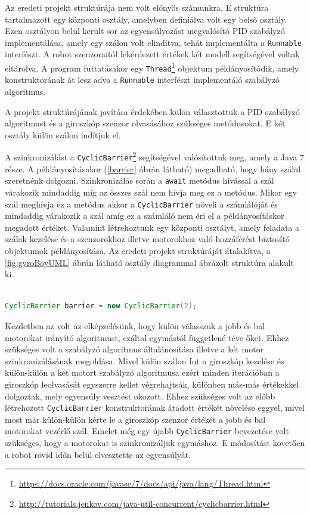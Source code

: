 Az eredeti projekt struktúrája nem volt előnyös számunkra. E struktúra tartalmazott egy központi osztály, amelyben definiálva volt egy belső osztály. Ezen osztályon belül került sor az egyensúlyozást megvalósító PID szabályzó implementálása, amely egy szálon volt elindítva, tehát implementálta a \texttt{Runnable} interfészt. A robot szenzoraitól lekérdezett értékek két modell segítségével voltak eltárolva. A program futtatásakor egy \texttt{Thread}\footnote{\href{https://docs.oracle.com/javase/7/docs/api/java/lang/Thread.html}{https://docs.oracle.com/javase/7/docs/api/java/lang/Thread.html}} objektum példányosítódik, amely konstruktorának át lesz adva a \texttt{Runnable} interfészt implementáló szabályzó algoritmus.

A projekt struktúrájának javítása érdekében külön választottuk a PID szabályzó algoritmust és a giroszkóp szenzor olvasásához szükséges metódusokat. E két osztály külön szálon indítjuk el. 

A szinkronizálást a \texttt{CyclicBarrier}\footnote{\href{http://tutorials.jenkov.com/java-util-concurrent/cyclicbarrier.html}{http://tutorials.jenkov.com/java-util-concurrent/cyclicbarrier.html}} segítségével valósítottuk meg, amely a Java 7 része. A példányosításakor (\ref{barrier} ábrán látható) megadható, hogy hány szálal szeretnénk dolgozni. Szinkronizálás során a \texttt{await} metódus hívással a szál várakozik mindaddig míg az összes szál nem hívja meg ez a metódus. Mikor egy szál meghívja ez a metódus akkor a \texttt{CyclicBarrier} növeli a számlálóját és mindaddig várakozik a szál amíg ez a számláló nem éri el a példányosításkor megadott értéket. Valamint létrehoztunk egy központi osztályt, amely feladata a szálak kezelése és a szenzorokhoz illetve motorokhoz való hozzáférést biztosító objektumok példányosítása. Az eredeti projekt struktúráját átalakítva, a \ref{fig:gyroBoyUML} ábrán látható osztály diagrammal ábrázolt struktúra alakult ki.

\begin{lstlisting}[label=barrier, caption= CyclicBarrier példányosítása , language=Java]

CyclicBarrier barrier = new CyclicBarrier(2);

\end{lstlisting}

Kezdetben az volt az elképzelésünk, hogy külön válasszuk a jobb és bal motorokat irányító algoritmust, ezáltal egymástól függetlené téve őket. Ehhez szükséges volt a szabályzó algoritmus általánosítása illetve a két motor szinkronizálásának megoldása. Mivel külön szálon fut a giroszkóp kezelése és külön-külön a két motort szabályzó algoritmusa ezért minden iterációban a giroszkóp leolvasását egyszerre kellet végrehajtsák, különben más-más értékekkel dolgoztak, mely egyensúly vesztést okozott. Ehhez szükséges volt az előbb létrehozott \texttt{CyclicBarrier} konstruktorának átadott értékét növelése eggyel, mivel most már külön-külön kérte le a giroszkóp szenzor értékét a jobb és bal motorokat vezérlő szál. Emelet még egy újabb \texttt{CyclicBarrier} bevezetése volt szükséges, hogy a motorokat is szinkronizáljuk egymáshoz. E módosítást követően a robot rövid időn belül elvesztette az egyensúlyát.

